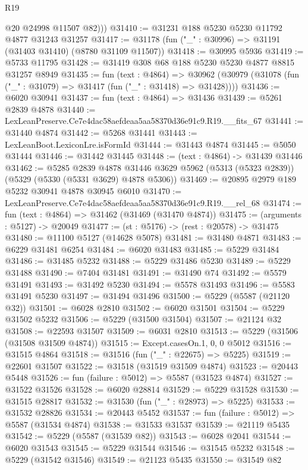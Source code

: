 \begin{lexlean}{R19}
\begin{coremodule}
          @20
          @24998
          @11507
          @82)))
@31410 := @31231 @188 @5230 @5230 @11792 @4877 @31243 @31257
@31417 := @31178 (fun ("_" : @30996) => @31191 (@31403 @31410) (@8780 @31109 @11507))
@31418 := @30995 @5936
@31419 := @5733 @11795
@31428 := @31419 @308 @68 @188 @5230 @5230 @4877 @8815 @31257 @8949
@31435 := fun (text : @4864) =>
  @30962 (@30979 (@31078 (fun ("_" : @31079) => @31417 (fun ("_" : @31418) => @31428))))
@31436 := @6020 @30941
@31437 := fun (text : @4864) => @31436
@31439 := @5261 @2839 @4878
@31440 := LexLeanPreserve.Ce7e4dac58aefdeaa5aa58370d36e91c9.R19.__fits_67
@31441 := @31440 @4874
@31442 := @5268 @31441
@31443 := LexLeanBoot.LexiconLre.isFormId
@31444 := @31443 @4874
@31445 := @5050 @31444
@31446 := @31442 @31445
@31448 := (text : @4864) -> @31439 @31446
@31462 := @5285
    @2839
    @4878
    @31446
    @3629
    @5962
    (@5313 (@5323 @2839))
    (@5329 (@5330 (@5331 @3629) @4878 @5306))
@31469 := @20895 @2979 @189 @5232 @30941 @4878 @30945 @6010
@31470 := LexLeanPreserve.Ce7e4dac58aefdeaa5aa58370d36e91c9.R19.__rel_68
@31474 := fun (text : @4864) => @31462 (@31469 (@31470 @4874))
@31475 := (arguments : @5127) -> @20049
@31477 := (st : @5176) -> (rest : @20578) -> @31475
@31480 := @11100 @5127 (@14628 @5078)
@31481 := @31480 @4871
@31483 := @6229 @31481 @6254
@31484 := @6020 @31483
@31485 := @5229 @31484
@31486 := @31485 @5232
@31488 := @5229 @31486 @5230
@31489 := @5229 @31488
@31490 := @7404 @31481
@31491 := @31490 @74
@31492 := @5579 @31491
@31493 := @31492 @5230
@31494 := @5578 @31493
@31496 := @5583 @31491 @5230
@31497 := @31494 @31496
@31500 := @5229 (@5587 (@21120 @32))
@31501 := @6028 @2810
@31502 := @6020 @31501
@31504 := @5229 @31502 @5232
@31506 := @5229 (@31500 @31504)
@31507 := @21124 @32
@31508 := @22593 @31507
@31509 := @6031 @2810
@31513 := @5229 (@31506 (@31508 @31509 @4874))
@31515 := Except.casesOn.{1, 0, 0} @5012
@31516 := @31515 @4864
@31518 := @31516 (fun ("_" : @22675) => @5225)
@31519 := @22601 @31507
@31522 := @31518 (@31519 @31509 @4874)
@31523 := @20443 @5448
@31526 := fun (failure : @5012) => @5587 (@31523 @4874)
@31527 := @31522 @31526
@31528 := @6020 @28814
@31529 := @5229 @31528
@31530 := @31515 @28817
@31532 := @31530 (fun ("_" : @28973) => @5225)
@31533 := @31532 @28826
@31534 := @20443 @5452
@31537 := fun (failure : @5012) => @5587 (@31534 @4874)
@31538 := @31533 @31537
@31539 := @21119 @5435
@31542 := @5229 (@5587 (@31539 @82))
@31543 := @6028 @2041
@31544 := @6020 @31543
@31545 := @5229 @31544
@31546 := @31545 @5232
@31548 := @5229 (@31542 @31546)
@31549 := @21123 @5435
@31550 := @31549 @82

\end{coremodule}
\end{lexlean}
